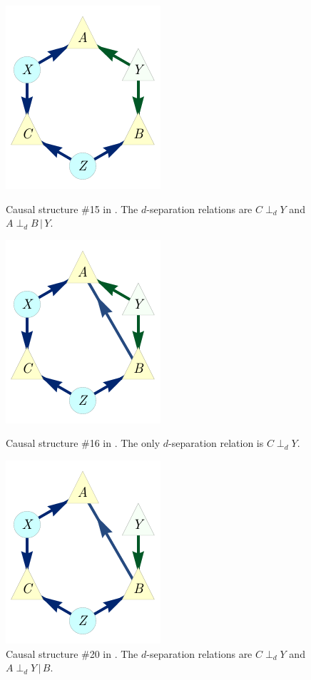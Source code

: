 \documentclass[aps,english,10pt,superscriptaddress,onecolumn,twoside,longbibliography,pra,floatfix,fleqn,nofootinbib]{revtex4-1}
\theoremstyle{definition}
\newcommand{\aindep}{\ensuremath{\perp_d}}
\begin{document}
\begin{figure}[t]
\centering
\begin{minipage}[t]{0.3\linewidth}
\centering
\includegraphics[scale=1]{scen15DAG.pdf}
\caption{Causal structure \#15 in \cite{pusey2014gdag}. The $d$-separation relations are $C\aindep Y$ and $A \aindep B\,|\,Y$.}\label{fig:GDAG15}
\end{minipage}
\hfill
\begin{minipage}[t]{0.3\linewidth}
\centering
\includegraphics[scale=1]{scen16DAG.pdf}
\caption{Causal structure \#16 in \cite{pusey2014gdag}. The only $d$-separation relation is $C\aindep Y$.}\label{fig:GDAG16}
\end{minipage}
\hfill
\begin{minipage}[t]{0.3\linewidth}
\centering
\includegraphics[scale=1]{scen20DAG.pdf}
\caption{Causal structure \#20 in \cite{pusey2014gdag}. The $d$-separation relations are $C\aindep Y$ and $A \aindep Y\,|\,B$.}\label{fig:GDAG20}
\end{minipage}
\hfill
\end{figure}
\end{document}
